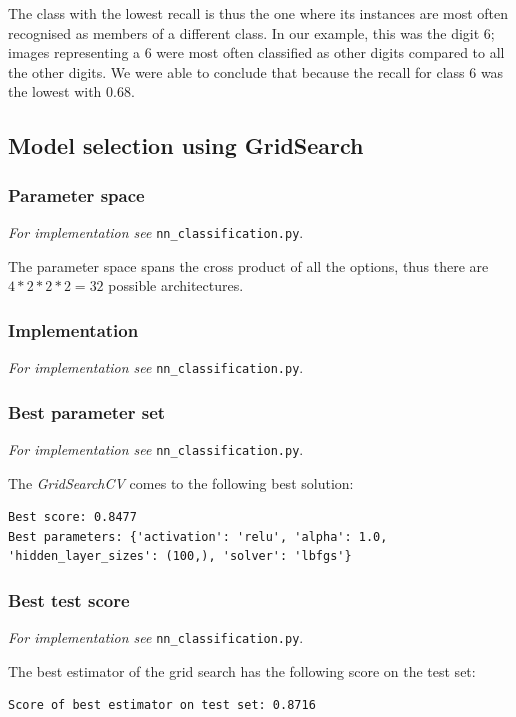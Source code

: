     The class with the lowest recall is thus the one where its instances are most often recognised as members of a different class.
    In our example, this was the digit 6; images representing a 6 were most often classified as other digits compared to all the other digits.
    We were able to conclude that because the recall for class 6 was the lowest with $0.68$.


    \subsection{Model selection using GridSearch}
    \subsubsection{Parameter space}

    \textit{For implementation see } \texttt{nn\_classification.py}.

    The parameter space spans the cross product of all the options, thus there are
    $4 * 2 * 2 * 2 = 32$ possible architectures.

    \subsubsection{Implementation}

    \textit{For implementation see } \texttt{nn\_classification.py}.

    \subsubsection{Best parameter set}

    \textit{For implementation see } \texttt{nn\_classification.py}.

    The \textit{GridSearchCV} comes to the following best solution:

    \begin{lstlisting}
Best score: 0.8477
Best parameters: {'activation': 'relu', 'alpha': 1.0, 'hidden_layer_sizes': (100,), 'solver': 'lbfgs'}
    \end{lstlisting}

    \subsubsection{Best test score}

    \textit{For implementation see } \texttt{nn\_classification.py}.

    The best estimator of the grid search has the following score on the test set:
    \begin{lstlisting}
Score of best estimator on test set: 0.8716
    \end{lstlisting}

